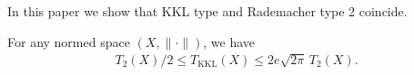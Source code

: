 In this paper we show that KKL type and Rademacher type 2 coincide. 

\begin{theorem}\label{mth1} For any normed space $(X, \|\cdot \|)$, we have
\begin{align*}
 T_{2}(X)/2 \leq T_{\mathrm{KKL}}(X) \leq  2e \sqrt{2\pi}\, T_{2}(X).
\end{align*}

\end{theorem}
